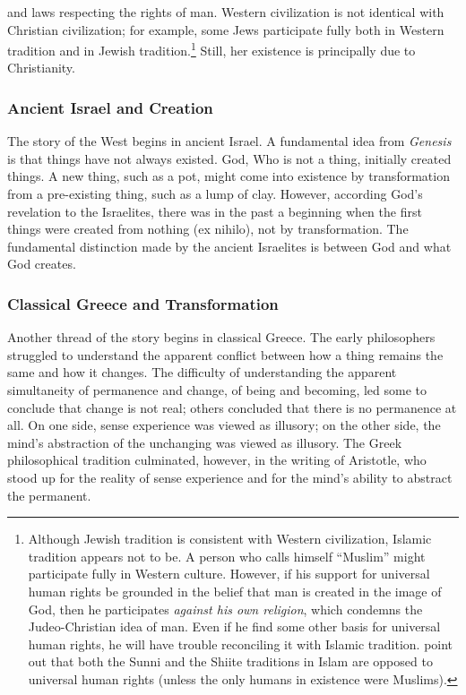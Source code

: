 \documentclass[twocolumn]{article}
\begin{document}
and laws respecting the rights of man.  Western civilization is not identical
with Christian civilization; for example, some Jews participate fully both in
Western tradition and in Jewish tradition.\footnote{%
   Although Jewish tradition is consistent with Western civilization, Islamic
   tradition appears not to be.  A person who calls himself ``Muslim'' might
   participate fully in Western culture.  However, if his support for universal
   human rights be grounded in the belief that man is created in the image of
   God, then he participates \emph{against his own religion}, which condemns
   the Judeo-Christian idea of man.  Even if he find some other basis for
   universal human rights, he will have trouble reconciling it with Islamic
   tradition.  \cite{as2003} point out that both the Sunni and the Shiite
   traditions in Islam are opposed to universal human rights (unless the only
   humans in existence were Muslims).
}
Still, her existence is principally due to Christianity.

\subsubsection{Ancient Israel and Creation}

The story of the West begins in ancient Israel.  A fundamental idea from {\it
Genesis} is that things have not always existed.  God, Who is not a thing,
initially created things.  A new thing, such as a pot, might come into
existence by transformation from a pre-existing thing, such as a lump of clay.
However, according God's revelation to the Israelites, there was in the past a
beginning when the first things were created from nothing (ex nihilo), not by
transformation.  The fundamental distinction made by the ancient Israelites is
between God and what God creates.

\subsubsection{Classical Greece and Transformation}

Another thread of the story begins in classical Greece.  The early philosophers
struggled to understand the apparent conflict between how a thing remains the
same and how it changes.  The difficulty of understanding the apparent
simultaneity of permanence and change, of being and becoming, led some to
conclude that change is not real; others concluded that there is no permanence
at all.  On one side, sense experience was viewed as illusory; on the other
side, the mind's abstraction of the unchanging was viewed as illusory.  The
Greek philosophical tradition culminated, however, in the writing of Aristotle,
who stood up for the reality of sense experience and for the mind's ability to
abstract the permanent.
\end{document}
